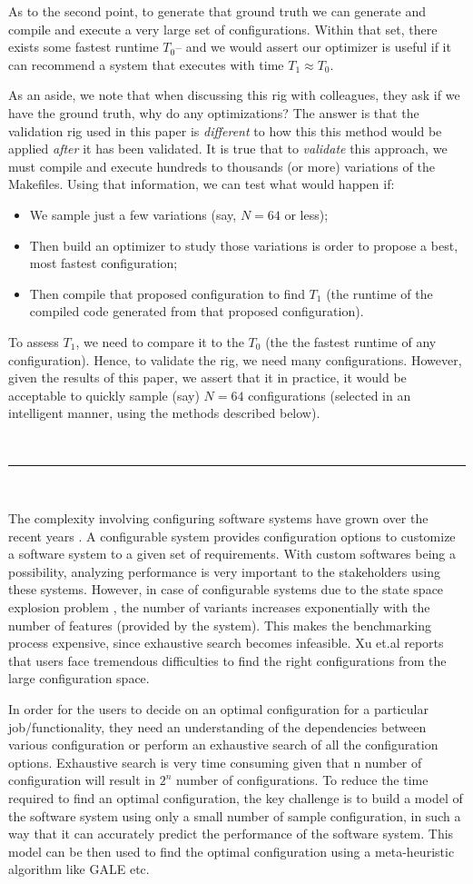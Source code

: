 \documentclass{sig-alternative}
\newcommand{\bi}{\begin{itemize}}%
\newcommand{\ei}{\end{itemize}}
\begin{document}
As to the second point, to generate that ground truth we can generate and compile and execute
a  very large set of configurations. Within that set, there exists some fastest runtime $T_0$--
and we would assert our optimizer is useful if it can recommend a system that executes
with time $T_1 \approx T_0$.

As an aside, we note that when discussing this rig with colleagues, they ask if we have the ground truth, why do any optimizations? The answer is that the validation rig used
in this paper is {\em different} to how this this method would be applied {\em after}
it has been validated. It is true that to {\em validate} this approach, we must compile
and execute hundreds to thousands (or more) variations of the Makefiles. Using that information,
we can test what would happen if:
\bi
\item We sample just a few variations (say, $N=64$ or less);
\item Then build an optimizer to study those variations is order to propose a best, most fastest configuration;
\item Then compile that proposed configuration to find $T_1$ (the runtime of the compiled code generated from that proposed configuration).
\ei
To assess $T_1$, we need to compare it to the $T_0$ (the  the fastest runtime of any configuration). Hence, to validate the rig, we need many configurations. However, given the results of this paper, we assert that it
in practice, it
would be acceptable to quickly sample (say) $N=64$ configurations (selected in an intelligent manner,  using the methods described below).

~\hrule~

The complexity involving configuring software systems have grown  over the recent years \cite{berger2013study}. A configurable system provides configuration options to customize a software system to a given set of requirements. With custom softwares being a possibility, analyzing performance is very important to the stakeholders using these systems. However, in case of configurable systems due to the state space explosion problem \cite{yilmaz2006covering}, the number of variants increases exponentially with the number of features (provided by the system). This makes the benchmarking process expensive, since exhaustive search becomes infeasible. Xu et.al \cite{xu2015hey} reports that users face tremendous difficulties to find the right configurations from the large configuration space. 
 
 In order for the users to decide on an optimal configuration for a particular job/functionality, they need an understanding of the dependencies between various configuration or perform an exhaustive search of all the configuration options. Exhaustive search is very time consuming given that n number of configuration will result in $2^n$ number of configurations. To reduce the time required to find an optimal configuration, the key challenge is to build a model of the software system using only a small number of sample configuration, in such a way that it can accurately predict the performance of the software system. This model can be then used to find the optimal configuration using a meta-heuristic algorithm like GALE etc. 
 
\end{document}
